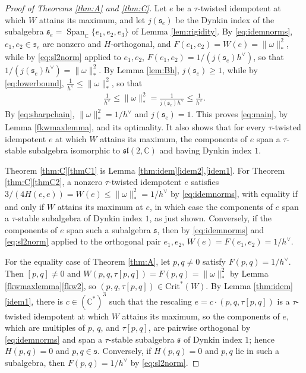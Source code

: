 \documentclass[leqno,10pt]{amsart}
\theoremstyle{definition}
\numberwithin{equation}{section}
\newcommand{\om}{\omega}
\newcommand{\spn}{\operatorname{Span}}
\newcommand{\sll}{\mathfrak{sl}}
\newcommand{\com}{\mathbb C}
\newcommand{\crtnt}{\mathrm{Crit}^*}
\newcommand{\hv}{h^\vee}
\newcommand{\comass}[1]{\lVert #1\rVert_{\ast}}%
\newcommand{\subs}{\mathfrak{s}}
\begin{document}
\begin{proof}[Proof of Theorems \ref{thm:A} and \ref{thm:C}]
Let $e$ be a $\tau$-twisted idempotent at which $W$ attains its maximum, and let $j(\subs_{e})$ be the Dynkin index of the subalgebra $\subs_{e} = \spn_{\com}\{e_{1}, e_{2}, e_{3}\}$ of Lemma \ref{lem:rigidity}. By \eqref{eq:idemnorms}, $e_{1}, e_{2} \in \subs_{e}$ are nonzero and $H$-orthogonal, and $F(e_{1}, e_{2}) = W(e) = \comass{\om}^{2}$, while by \eqref{eq:sl2norm} applied to $e_{1}, e_{2}$, $F(e_{1}, e_{2}) = 1/(j(\subs_{e})\hv)$, so that $1/(j(\subs_{e})\hv) = \comass{\om}^{2}$. By Lemma \ref{lem:Bh}, $j(\subs_{e}) \geq 1$, while by  \eqref{eq:lowerbound}, $\frac{1}{\hv} \leq\comass{\om}^{2}$, so that
\begin{align}\label{eq:sharpchain}
\frac{1}{\hv} \leq \comass{\om}^{2} = \frac{1}{j(\subs_{e})\hv} \leq \frac{1}{\hv}.
\end{align}
By \eqref{eq:sharpchain}, $\comass{\om}^{2} = 1/\hv$ and $j(\subs_{e}) = 1$. This proves \eqref{eq:main}, by Lemma \ref{fkwmaxlemma}, and its optimality. It also shows that for every $\tau$-twisted idempotent $e$ at which $W$ attains its maximum, the components of $e$ span a $\tau$-stable subalgebra isomorphic to $\sll(2, \com)$ and having Dynkin index $1$.

Theorem \ref{thm:C}\ref{thmC1} is Lemma \ref{thm:idem}\ref{idem2},\ref{idem1}. For Theorem \ref{thm:C}\ref{thmC2}, a nonzero $\tau$-twisted idempotent $e$ satisfies $3/(4H(e, e)) = W(e) \leq \comass{\om}^{2} = 1/\hv$ by \eqref{eq:idemnorms}, with equality if and only if $W$ attains its maximum at $e$, in which case the components of $e$ span a $\tau$-stable subalgebra of Dynkin index $1$, as just shown. Conversely, if the components of $e$ span such a subalgebra $\subs$, then by \eqref{eq:idemnorms} and \eqref{eq:sl2norm} applied to the orthogonal pair $e_{1}, e_{2}$, $W(e) = F(e_{1}, e_{2}) = 1/\hv$.

For the equality case of Theorem \ref{thm:A}, let $p, q \neq 0$ satisfy $F(p, q) = 1/\hv$. Then $[p, q] \neq 0$ and $W(p, q, \tau[p, q]) = F(p, q) = \comass{\om}^{2}$ by Lemma \ref{fkwmaxlemma}\ref{fkw2}, so $(p, q, \tau[p, q]) \in \crtnt(W)$. By Lemma \ref{thm:idem}\ref{idem1}, there is $c \in (\com^{\ast})^{3}$ such that the rescaling $e = c \cdot (p, q, \tau[p, q])$ is a $\tau$-twisted idempotent at which $W$ attains its maximum, so the components of $e$, which are multiples of $p$, $q$, and $\tau[p, q]$, are pairwise orthogonal by \eqref{eq:idemnorms} and span a $\tau$-stable subalgebra $\subs$ of Dynkin index $1$; hence $H(p, q) = 0$ and $p, q \in \subs$. Conversely, if $H(p, q) = 0$ and $p, q$ lie in such a subalgebra, then $F(p, q) = 1/\hv$ by \eqref{eq:sl2norm}.
\end{proof}
\end{document}
